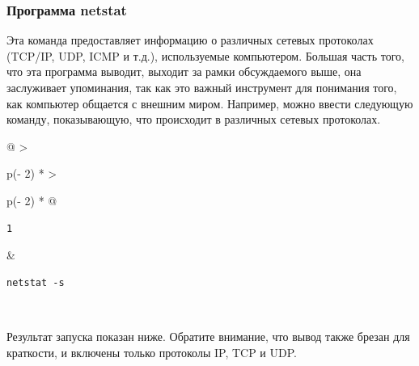 \documentclass{report}
\begin{document}
\hypertarget{netstat}{%
\subsubsection{\texorpdfstring{\protect\hyperlink{netstat}{}Программа
netstat}{Программа netstat}}\label{netstat}}

Эта команда предоставляет информацию о различных сетевых протоколах
(TCP/IP, UDP, ICMP и т.д.), используемые компьютером. Большая часть
того, что эта программа выводит, выходит за рамки обсуждаемого выше, она
заслуживает упоминания, так как это важный инструмент для понимания
того, как компьютер общается с внешним миром. Например, можно ввести
следующую команду, показывающую, что происходит в различных сетевых
протоколах.

\begin{longtable}[]{@{}
  >{\raggedright\arraybackslash}p{(\columnwidth - 2\tabcolsep) * }
  >{\raggedright\arraybackslash}p{(\columnwidth - 2\tabcolsep) * }@{}}
\toprule
\endhead
\begin{minipage}[t]{\linewidth}\raggedright
\begin{verbatim}
1
\end{verbatim}
\end{minipage} & \begin{minipage}[t]{\linewidth}\raggedright
\begin{verbatim}
netstat -s
\end{verbatim}
\end{minipage} \\ \addlinespace
\bottomrule
\end{longtable}

Результат запуска показан ниже. Обратите внимание, что вывод также
брезан для краткости, и включены только протоколы IP, TCP и UDP.
\end{document}
